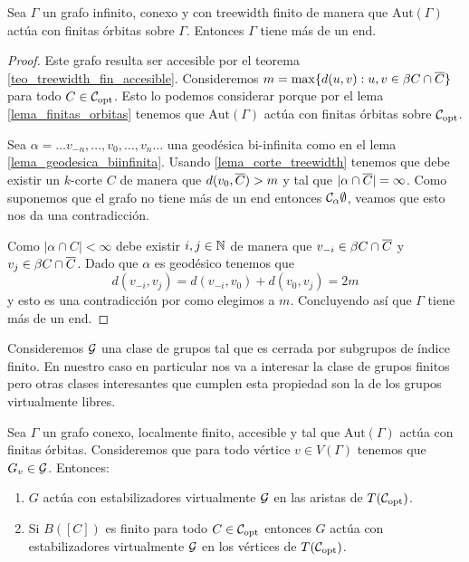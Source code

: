 \documentclass[tesis.tex]{subfiles}
\newcommand{\aut}{\text{Aut}}
\begin{document}
\begin{lema}\label{lema_tw_mas_1_end}
	Sea $\Gamma$ un grafo infinito, conexo y con treewidth finito de manera que $\aut(\Gamma)$ actúa con finitas órbitas sobre $\Gamma$.
	Entonces $\Gamma$ tiene más de un end.
\end{lema}
\begin{proof}
	Este grafo resulta ser accesible por el teorema \ref{teo_treewidth_fin_accesible}.
	Consideremos $m = \max \{  d(u,v) : u,v \in \beta C \cap \overline C \}$ para todo $C \in {\cal C}_{\text{opt}}$.
	Esto lo podemos considerar porque por el lema \ref{lema_finitas_orbitas} tenemos que $\aut(\Gamma)$ actúa con finitas órbitas sobre ${\cal C}_{\text{opt}}$.
	
	Sea $\alpha = \dots v_{-n}, \dots, v_{0}, \dots, v_{n} \dots$ una geodésica bi-infinita como en el lema \ref{lema_geodesica_biinfinita}.
	Usando \ref{lema_corte_treewidth} tenemos que debe existir un $k$-corte $C$ de manera que $d(v_{0}, \overline C) > m$ y tal que $|\alpha \cap \overline C|=\infty$.
	Como suponemos que el grafo no tiene más de un end entonces ${\cal{C}}_{\alpha} \emptyset$, veamos que esto nos da una contradicción.
	
	Como $|\alpha \cap C| < \infty$ debe existir $i,j \in \mathbb{N}$ de manera que $v_{-i} \in \beta C \cap \overline C$ y $v_{j} \in \beta C \cap \overline C$.
	Dado que $\alpha$ es geodésico tenemos que
	\[
		d(v_{-i},v_{j}) = d(v_{-i},v_{0}) + d(v_{0}, v_{j}) = 2m
	\]
	y esto es una contradicción por como elegimos a $m$. 
	Concluyendo así que $\Gamma$ tiene más de un end.
	
\end{proof}

Consideremos ${\cal G}$ una clase de grupos tal que es cerrada por subgrupos de índice finito.
En nuestro caso en particular nos va a interesar la clase de grupos finitos pero otras clases interesantes que cumplen esta propiedad son la de los grupos virtualmente libres.

\begin{prop}\label{prop_clase_grupos_accion}
	Sea $\Gamma$ un grafo conexo, localmente finito, accesible y tal que $\aut(\Gamma)$ actúa con finitas órbitas.
	Consideremos que para todo vértice $v \in V(\Gamma)$ tenemos que $G_{v} \in {\cal G}$.
	Entonces:
	\begin{enumerate}
		\item $G$ actúa con estabilizadores virtualmente ${\cal G}$ en las aristas de $T({\cal C}_{\text{opt}})$.
		\item Si $B([C])$ es finito para todo $C \in {\cal C}_{\text{opt}}$ entonces $G$ actúa con estabilizadores virtualmente ${\cal G}$ en los vértices de $T({\cal C}_{\text{opt}})$.
	\end{enumerate}	
\end{prop}
\end{document}
